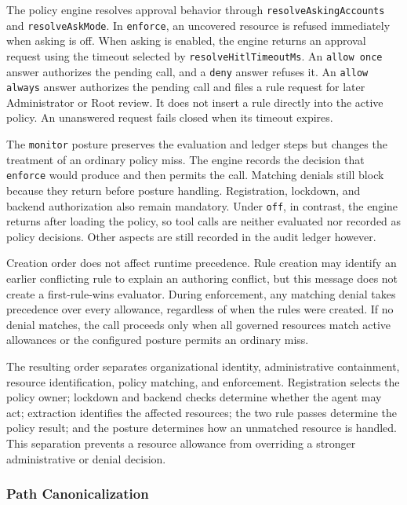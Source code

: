 The policy engine resolves approval behavior through
\texttt{resolveAskingAccounts} and \texttt{resolveAskMode}. In
\texttt{enforce}, an uncovered resource is refused immediately when asking is
off. When asking is enabled, the engine returns an approval request using the
timeout selected by \texttt{resolveHitlTimeoutMs}. An
\texttt{allow once} answer authorizes the pending call, and a
\texttt{deny} answer refuses it. An \texttt{allow always} answer authorizes
the pending call and files a rule request for later Administrator or Root
review. It does not insert a rule directly into the active policy. An
unanswered request fails closed when its timeout expires.

The \texttt{monitor} posture preserves the evaluation and ledger steps but
changes the treatment of an ordinary policy miss. The engine records the
decision that \texttt{enforce} would produce and then permits the call.
Matching denials still block because they return before posture handling.
Registration, lockdown, and backend authorization also remain mandatory.
Under \texttt{off}, in contrast, the engine returns after loading the policy, so tool calls are neither evaluated nor recorded as policy decisions. Other aspects are still recorded in the audit ledger however.

Creation order does not affect runtime precedence. Rule creation may identify
an earlier conflicting rule to explain an authoring conflict, but this message
does not create a first-rule-wins evaluator. During enforcement, any matching
denial takes precedence over every allowance, regardless of when the rules
were created. If no denial matches, the call proceeds only when all governed
resources match active allowances or the configured posture permits an
ordinary miss.

The resulting order separates organizational identity, administrative
containment, resource identification, policy matching, and enforcement.
Registration selects the policy owner; lockdown and backend checks determine
whether the agent may act; extraction identifies the affected resources; the
two rule passes determine the policy result; and the posture determines how an
unmatched resource is handled. This separation prevents a resource allowance
from overriding a stronger administrative or denial decision.

\FloatBarrier
\subsubsection{Path Canonicalization}
\label{sec: path-canonz}

